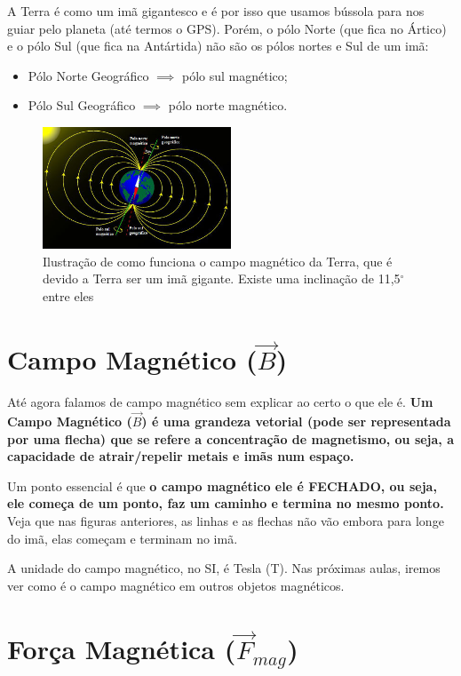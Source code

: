 \documentclass[12pt]{extarticle}
\newcommand{\<}{\langle}
\renewcommand{\>}{\rangle}
\theoremstyle{definition}
\begin{document}
A Terra é como um imã gigantesco e é por isso que usamos bússola para nos guiar pelo planeta (até termos o GPS). Porém, o pólo Norte (que fica no Ártico) e o pólo Sul (que fica na Antártida) não são os pólos nortes e Sul de um imã:
\begin{itemize}
    \item Pólo Norte Geográfico $\implies$ pólo sul magnético;
    \item Pólo Sul Geográfico $\implies$ pólo norte magnético.
\end{itemize}

\begin{figure}[h]
    \centering
    \includegraphics[width=0.5\textwidth]{campo-magnetico-terrestre.jpg}
    \caption{Ilustração de como funciona o campo magnético da Terra, que é devido a Terra ser um imã gigante. Existe uma inclinação de 11,5$^{\circ}\:$ entre eles}
    \label{fig:campo_mag_terra}
\end{figure}

\section{Campo Magnético ($\vec{B}$)}

Até agora falamos de campo magnético sem explicar ao certo o que ele é. \textbf{Um Campo Magnético ($\vec{B}$) é uma grandeza vetorial (pode ser representada por uma flecha) que se refere a concentração de magnetismo, ou seja, a capacidade de atrair/repelir metais e imãs num espaço.}

Um ponto essencial é que \textbf{o campo magnético ele é FECHADO, ou seja, ele começa de um ponto, faz um caminho e termina no mesmo ponto.} Veja que nas figuras anteriores, as linhas e as flechas não vão embora para longe do imã, elas começam e terminam no imã.

A unidade do campo magnético, no SI, é Tesla (T). Nas próximas aulas, iremos ver como é o campo magnético em outros objetos magnéticos.

\section{Força Magnética ($\vec{F}_{mag}$)}
\end{document}
